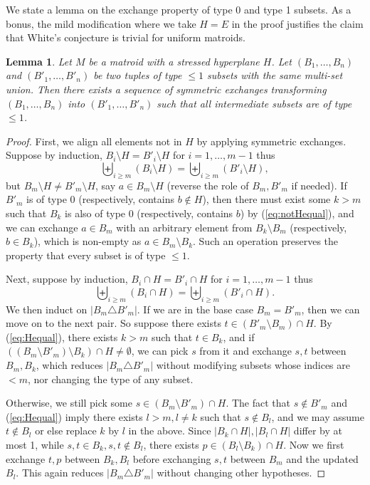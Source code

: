 \documentclass{amsart}
\newtheorem{lemma}[theorem]{Lemma}
\begin{document}
We state a lemma on the exchange property of type 0 and type 1 subsets. As a bonus, the mild modification where we take $H=E$ in the proof justifies the claim that White's conjecture is trivial for uniform matroids.

\begin{lemma}\label{lem:type1-WC}
    Let $M$ be a matroid with a stressed hyperplane $H$.  
    Let $(B_1,\dots,B_n)$ and $(B'_1,\dots,B'_n)$ be two tuples of type $\leq 1$ subsets with the same multi-set union.
    Then there exists a sequence of symmetric exchanges transforming $(B_1,\dots,B_n)$ into $(B'_1,\dots,B'_n)$ such that all intermediate subsets are of type $\leq 1$.
\end{lemma}

\begin{proof}
First, we align all elements not in $H$ by applying symmetric exchanges. Suppose by induction, $B_i \setminus H = B'_i \setminus H$ for $i=1,\ldots,m-1$ thus 
\begin{equation}\label{eq:notHequal}
    \biguplus_{i\geq m} (B_i \setminus H)=\biguplus_{i\geq m} (B'_i \setminus H),
\end{equation}
but $B_m \setminus H \neq B'_m \setminus H$, say $a\in B_m \setminus H$ (reverse the role of $B_m,B'_m$ if needed). If $B'_m$ is of type 0 (respectively, contains $b\not\in H$), then there must exist some $k>m$ such that $B_k$ is also of type 0 (respectively, contains $b$) by (\ref{eq:notHequal}), and we can exchange $a\in B_m$ with an arbitrary element from $B_k\setminus B_m$ (respectively, $b\in B_k$), which is non-empty as $a\in B_m\setminus B_k$. Such an operation preserves the property that every subset is of type $\leq 1$.

Next, suppose by induction, $B_i \cap H = B'_i \cap H$ for $i=1,\ldots,m-1$ thus 
\begin{equation}\label{eq:Hequal}
    \biguplus_{i\geq m} (B_i \cap H)=\biguplus_{i\geq m} (B'_i \cap H).
\end{equation}
We then induct on $|B_m\triangle B'_m|$. If we are in the base case $B_m=B'_m$, then we can move on to the next pair. So suppose there exists $t\in (B'_m\setminus B_m) \cap H$. By (\ref{eq:Hequal}), there exists $k>m$ such that $t\in B_k$, and if $((B_m\setminus B'_m)\setminus B_k)\cap H\neq\emptyset$, we can pick $s$ from it and exchange $s,t$ between $B_m,B_k$, which reduces $|B_m\triangle B'_m|$ without modifying subsets whose indices are $<m$, nor changing the type of any subset.

Otherwise, we still pick some $s\in (B_m\setminus B'_m) \cap H$. The fact that $s\not\in B'_m$ and (\ref{eq:Hequal}) imply there exists $l>m, l\neq k$ such that $s\not\in B_l$, and we may assume $t\not\in B_l$ or else replace $k$ by $l$ in the above. Since $|B_k\cap H|, |B_l\cap H|$ differ by at most 1, while $s,t\in B_k, s,t\not\in B_l$, there exists $p\in (B_l\setminus B_k)\cap H$. Now we first exchange $t,p$ between $B_k, B_l$ before exchanging $s,t$ between $B_m$ and the updated $B_l$. This again reduces $|B_m\triangle B'_m|$ without changing other hypotheses.
\end{proof}
\end{document}
